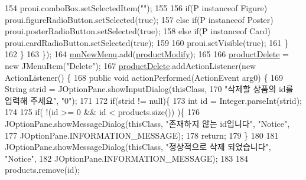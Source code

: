 \begin{DoxyCode}
154                     proui.comboBox.setSelectedItem(\textcolor{stringliteral}{""});
155                     
156                     \textcolor{keywordflow}{if}(P instanceof Figure) proui.figureRadioButton.setSelected(\textcolor{keyword}{true});
157                     \textcolor{keywordflow}{else} \textcolor{keywordflow}{if}(P instanceof Poster) proui.posterRadioButton.setSelected(\textcolor{keyword}{true});
158                     \textcolor{keywordflow}{else} \textcolor{keywordflow}{if}(P instanceof Card) proui.cardRadioButton.setSelected(\textcolor{keyword}{true});
159                     
160                     proui.setVisible(\textcolor{keyword}{true}); 
161                 \}
162             \}
163         \});
164         \hyperlink{classpkg_1_1_management_u_i_a02082701769fb188544b2211ebc5f759}{mnNewMenu}.add(\hyperlink{classpkg_1_1_management_u_i_a2384d030e607b71538e1f809991b95be}{productModify});
165         
166         \hyperlink{classpkg_1_1_management_u_i_a035f7669304affd98f4304a8639ce4e8}{productDelete} = \textcolor{keyword}{new} JMenuItem(\textcolor{stringliteral}{"Delete"});
167         \hyperlink{classpkg_1_1_management_u_i_a035f7669304affd98f4304a8639ce4e8}{productDelete}.addActionListener(\textcolor{keyword}{new} ActionListener() \{
168             \textcolor{keyword}{public} \textcolor{keywordtype}{void} actionPerformed(ActionEvent arg0) \{
169                 String strid = JOptionPane.showInputDialog(thisClass,
170                         \textcolor{stringliteral}{"삭제할 상품의 id를 입력해 주세요"}, \textcolor{stringliteral}{"0"});
171                 
172                 \textcolor{keywordflow}{if}(strid != null)\{
173                     \textcolor{keywordtype}{int} \textcolor{keywordtype}{id} = Integer.parseInt(strid);
174                     
175                     \textcolor{keywordflow}{if}( !(\textcolor{keywordtype}{id} >= 0 && \textcolor{keywordtype}{id} < products.size()) )\{
176                         JOptionPane.showMessageDialog(thisClass, \textcolor{stringliteral}{"존재하지 않는 id입니다"}, \textcolor{stringliteral}{"Notice"}, 
177                                 JOptionPane.INFORMATION\_MESSAGE);
178                         \textcolor{keywordflow}{return};
179                     \}
180                     
181                     JOptionPane.showMessageDialog(thisClass, \textcolor{stringliteral}{"정상적으로 삭제 되었습니다"}, \textcolor{stringliteral}{"Notice"}, 
182                             JOptionPane.INFORMATION\_MESSAGE);
183                     
184                     products.remove(\textcolor{keywordtype}{id});

\end{DoxyCode}
